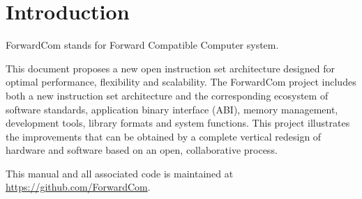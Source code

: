 \documentclass[forwardcom.tex]{subfiles}
\begin{document}
\RaggedRight

\chapter{Introduction}
ForwardCom stands for Forward Compatible Computer system.
\vspace{2mm}

This document proposes a new open instruction set architecture designed for optimal performance, flexibility and scalability. The ForwardCom project includes both a new instruction set architecture and the corresponding ecosystem of software standards, application binary interface (ABI), memory management, development tools, library formats and system functions. This project illustrates the improvements that can be obtained by a complete vertical redesign of hardware and software based on an open, collaborative process.
\vspace{2mm}

This manual and all associated code is maintained at 
\href{https://github.com/ForwardCom/}{https://github.com/ForwardCom}.

 
\end{document}
